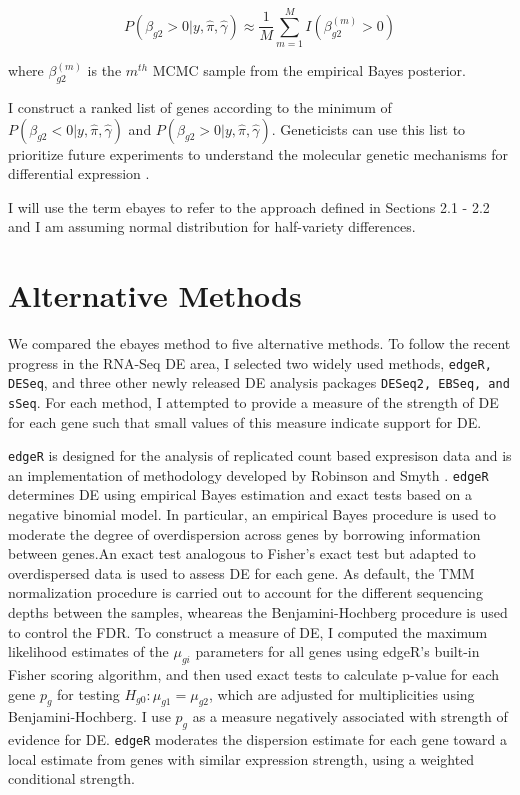 $$P(\beta_{g2}> 0 | y, \hat{\pi}, \hat{\gamma}) \approx \frac{1}{M} \sum_{m=1}^M I(\beta_{g2} ^ {(m)} > 0) $$

where $\beta_{g2}^{(m)}$ is the $m^{th}$ MCMC sample from the empirical Bayes posterior.



I construct a ranked list of genes according to the minimum of $P(\beta_{g2}< 0 | y, \hat{\pi}, \hat{\gamma})$ and $P(\beta_{g2}> 0 | y, \hat{\pi}, \hat{\gamma})$. Geneticists can use this list to prioritize future experiments to understand the molecular genetic mechanisms for differential expression \citep{niemi2015empirical}. 

I will use the term ebayes to refer to the approach defined in Sections 2.1 - 2.2 and I am assuming normal distribution for half-variety differences.

\section{Alternative Methods}

We compared the ebayes method to five alternative methods. To follow the recent progress in the RNA-Seq DE area, I selected two widely used methods, {\tt edgeR, DESeq}, and three other newly released DE analysis packages {\tt DESeq2, EBSeq, and sSeq}. For each method, I attempted to provide a measure of the strength of DE for each gene such that small values of this measure indicate support for DE. 


{\tt edgeR} is designed for the analysis of replicated count based expresison data and is an implementation of methodology developed by Robinson and Smyth \citep{robinson2007moderated}. {\tt edgeR} determines DE using empirical Bayes estimation and exact tests based on a negative binomial model. In particular, an empirical Bayes procedure is used to moderate the degree of overdispersion across genes by borrowing information between genes.An exact test analogous to Fisher's exact test but adapted to overdispersed data is used to assess DE for each gene. As default, the TMM normalization procedure is carried out to account for the different sequencing depths between the samples, wheareas the Benjamini-Hochberg procedure is used to control the FDR\citep{seyednasrollah2013comparison}. To construct a measure of DE, I computed the maximum likelihood estimates of the $\mu_{gi}$ parameters for all genes using edgeR's built-in Fisher scoring algorithm, and then used exact tests to calculate p-value for each gene $p_g$ for testing $H_{g0}: \mu_{g1} = \mu_{g2}$, which are adjusted for multiplicities using Benjamini-Hochberg. I use $p_g$ as a measure negatively associated with strength of evidence for DE. {\tt edgeR} moderates the dispersion estimate for each gene toward a local estimate from genes with similar expression strength, using a weighted conditional strength.


